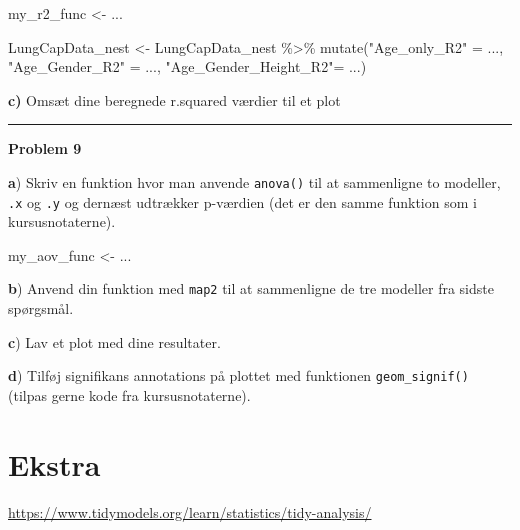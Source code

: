 \documentclass[
]{book}
\newenvironment{Shaded}{\begin{snugshade}}{\end{snugshade}}
\newcommand{\FunctionTok}[1]{\textcolor[rgb]{0.00,0.00,0.00}{#1}}
\newcommand{\NormalTok}[1]{#1}
\newcommand{\OtherTok}[1]{\textcolor[rgb]{0.56,0.35,0.01}{#1}}
\newcommand{\SpecialCharTok}[1]{\textcolor[rgb]{0.00,0.00,0.00}{#1}}
\newcommand{\StringTok}[1]{\textcolor[rgb]{0.31,0.60,0.02}{#1}}
\begin{document}
\begin{Shaded}
\begin{Highlighting}[]
\NormalTok{my\_r2\_func }\OtherTok{\textless{}{-}}\NormalTok{ ...}
\end{Highlighting}
\end{Shaded}

\begin{Shaded}
\begin{Highlighting}[]
\NormalTok{LungCapData\_nest }\OtherTok{\textless{}{-}}\NormalTok{ LungCapData\_nest }\SpecialCharTok{\%\textgreater{}\%}
  \FunctionTok{mutate}\NormalTok{(}\StringTok{"Age\_only\_R2"} \OtherTok{=}\NormalTok{ ...,}
         \StringTok{"Age\_Gender\_R2"} \OtherTok{=}\NormalTok{ ...,}
         \StringTok{"Age\_Gender\_Height\_R2"}\OtherTok{=}\NormalTok{ ...)}
\end{Highlighting}
\end{Shaded}

\textbf{c)} Omsæt dine beregnede r.squared værdier til et plot

\begin{center}\rule{0.5\linewidth}{0.5pt}\end{center}

\textbf{Problem 9}

\textbf{a}) Skriv en funktion hvor man anvende \texttt{anova()} til at sammenligne to modeller, \texttt{.x} og \texttt{.y} og dernæst udtrækker p-værdien (det er den samme funktion som i kursusnotaterne).

\begin{Shaded}
\begin{Highlighting}[]
\NormalTok{my\_aov\_func }\OtherTok{\textless{}{-}}\NormalTok{ ...}
\end{Highlighting}
\end{Shaded}

\textbf{b}) Anvend din funktion med \texttt{map2} til at sammenligne de tre modeller fra sidste spørgsmål.

\textbf{c}) Lav et plot med dine resultater.

\textbf{d}) Tilføj signifikans annotations på plottet med funktionen \texttt{geom\_signif()} (tilpas gerne kode fra kursusnotaterne).

\hypertarget{ekstra}{%
\section{Ekstra}\label{ekstra}}

\url{https://www.tidymodels.org/learn/statistics/tidy-analysis/}
\end{document}
